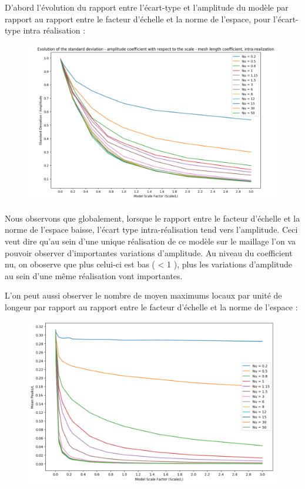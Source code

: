 \documentclass[a4paper,10pt]{article}
\begin{document}
	D'abord l'évolution du rapport entre l'écart-type et l'amplitude du modèle par rapport au rapport entre le facteur d'échelle et la norme de l'espace, pour l'écart-type intra réalisation : 
	
\begin{figure}[H]
   \centering   
   \noindent \includegraphics[width = \linewidth]{stdDevIntra.png}
      \caption{}
         \label{stdDevIntra}
\end{figure}
	
	Nous observons que globalement, lorsque le rapport entre le facteur d'échelle et la norme de l'espace baisse, l'écart type intra-réalisation tend vers l'amplitude. Ceci veut dire qu'au sein d'une unique réalisation de ce modèle sur le maillage l'on va pouvoir observer d'importantes variations d'amplitude.
	Au niveau du coefficient nu, on oboserve que plus celui-ci est bas ( < 1 ), plus les variations d'amplitude au sein d'une même réalisation vont importantes. 
	
	L'on peut aussi observer le nombre de moyen maximums locaux par unité de longeur par rapport au rapport entre le facteur d'échelle et la norme de l'espace : 
	
\begin{figure}[H]
   \centering   
   \noindent \includegraphics[width = \linewidth]{peakScale.png}
      \caption{}
         \label{peakScale}
\end{figure}
\end{document}
